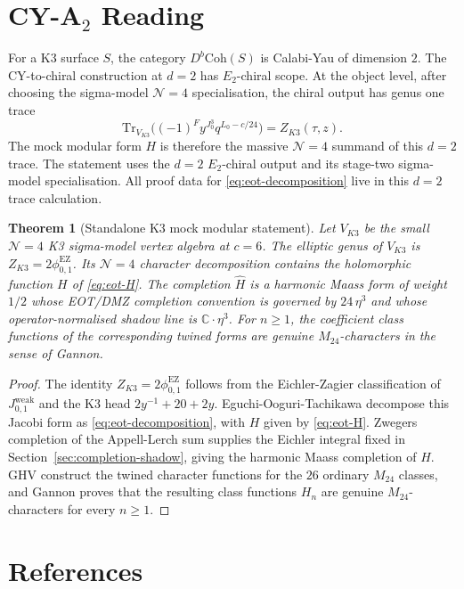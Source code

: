 \documentclass[11pt]{article}
\newtheorem{theorem}{Theorem}
\theoremstyle{definition}
\theoremstyle{remark}
\newcommand{\CC}{\mathbb{C}}
\newcommand{\Db}{D^b}
\newcommand{\Coh}{\mathrm{Coh}}
\newcommand{\Tr}{\mathrm{Tr}}
\newcommand{\phiEZ}{\phi_{0,1}^{\mathrm{EZ}}}
\begin{document}
\section{CY-A\texorpdfstring{$_2$}{2} Reading}
\label{sec:cy-a2-reading}

For a K3 surface \(S\), the category \(\Db\Coh(S)\) is Calabi-Yau of
dimension \(2\).  The CY-to-chiral construction at \(d=2\) has
\(E_2\)-chiral scope.  At the object level, after choosing the
sigma-model \(\mathcal N=4\) specialisation, the chiral output has genus
one trace
\[
  \Tr_{V_{K3}}
  \bigl((-1)^F y^{J_0^3}q^{L_0-c/24}\bigr)
  =
  Z_{K3}(\tau,z).
\]
The mock modular form \(H\) is therefore the massive \(\mathcal N=4\)
summand of this \(d=2\) trace.  The statement uses the \(d=2\)
\(E_2\)-chiral output and its stage-two sigma-model specialisation.
All proof data for \eqref{eq:eot-decomposition} live in this \(d=2\)
trace calculation.

\begin{theorem}[Standalone K3 mock modular statement]
\label{thm:standalone-k3-mock}
Let \(V_{K3}\) be the small \(\mathcal N=4\) K3 sigma-model vertex
algebra at \(c=6\).  The elliptic genus of \(V_{K3}\) is
\(Z_{K3}=2\phiEZ\).  Its \(\mathcal N=4\) character decomposition
contains the holomorphic function \(H\) of \eqref{eq:eot-H}.  The
completion \(\widehat H\) is a harmonic Maass form of weight \(1/2\)
whose EOT/DMZ completion convention is governed by \(24\,\eta^3\) and
whose operator-normalised shadow line is \(\CC\cdot\eta^3\).  For
\(n\geq 1\), the coefficient class functions of the corresponding
twined forms are genuine \(M_{24}\)-characters in the sense of Gannon.
\end{theorem}

\begin{proof}
The identity \(Z_{K3}=2\phiEZ\) follows from the Eichler-Zagier
classification of \(J_{0,1}^{\mathrm{weak}}\) and the K3 head
\(2y^{-1}+20+2y\).  Eguchi-Ooguri-Tachikawa decompose this Jacobi
form as \eqref{eq:eot-decomposition}, with \(H\) given by
\eqref{eq:eot-H}.  Zwegers completion of the Appell-Lerch sum supplies
the Eichler integral fixed in Section~\ref{sec:completion-shadow},
giving the harmonic Maass completion of \(H\).  GHV construct the
twined character functions for the \(26\) ordinary \(M_{24}\) classes,
and Gannon proves that the resulting class functions \(H_n\) are
genuine \(M_{24}\)-characters for every \(n\geq 1\).
\end{proof}

\section{References}
\label{sec:references}
\end{document}
